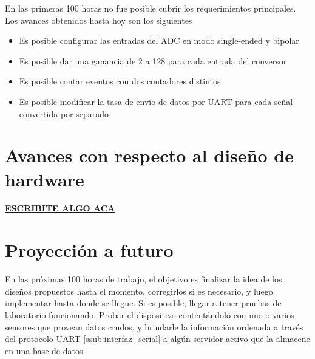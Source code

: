 \documentclass{article}
\theoremstyle{definition}
\theoremstyle{remark}
\begin{document}
En las primeras 100 horas no fue posible cubrir los requerimientos principales. Los avances obtenidos hasta hoy son los siguientes

\begin{itemize}
  \item Es posible configurar las entradas del ADC en modo single-ended y bipolar
  \item Es posible dar una ganancia de 2 a 128 para cada entrada del conversor
  \item Es posible contar eventos con dos contadores distintos
  \item Es posible modificar la tasa de envío de datos por UART para cada señal convertida por separado
\end{itemize}


\section{Avances con respecto al diseño de hardware} %
\label{sec:avances_con_respecto_al_diseno_de_hardware}

\textbf{\underline{ESCRIBITE ALGO ACA}}


\section{Proyección a futuro} %
\label{sec:proyeccion_a_futuro}

En las próximas 100 horas de trabajo, el objetivo es finalizar la idea de los diseños propuestos hasta el momento, corregirlos si es necesario, y luego implementar hasta donde se llegue. Si es posible, llegar a tener pruebas de laboratorio funcionando. Probar el dispositivo contentándolo con uno o varios sensores que provean datos crudos, y brindarle la información ordenada a través del protocolo UART \ref{ssub:interfaz_serial} a algún servidor activo que la almacene en una base de datos.
\end{document}
